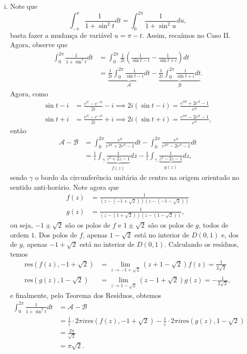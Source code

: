 \documentclass[12pt,a4paper]{article}
\newcommand{\res}{\mathrm{res}}
\begin{document}
\begin{enumerate}
\begin{enumerate}[(i)]
		\item Note que 
		$$
		\int_{-\pi}^{\pi}\frac{1}{1 + \sin^2t}dt = \int_{0}^{2\pi}\frac{1}{1 + \sin^2 u}du,
		$$
		basta fazer a mudança de variável $u = \pi - t$. Assim, recaímos no Caso II. Agora, observe que
		\begin{align*}
		\int_{0}^{2\pi}\frac{1}{1 + \sin^2 t}dt &= \int_{0}^{2\pi}\frac{1}{2i}\left( \frac{1}{\sin t - i} - \frac{1}{\sin t + i} \right)dt \\ 
		&= \underbrace{\frac{1}{2i}\int_{0}^{2\pi}\frac{1}{\sin t - i}dt}_{\mathcal{A}} - \underbrace{\frac{1}{2i}\int_{0}^{2\pi}\frac{1}{\sin t + i}dt}_{\mathcal{B}}.
		\end{align*}
		Agora, como
		\begin{align*}
		\sin t - i &= \frac{e^{it} - e^{-it}}{2i} - i \implies 2i(\sin t - i) = \frac{e^{2it} + 2e^{it} - 1}{e^{it}} \\
		\sin t + i &= \frac{e^{it} - e^{-it}}{2i} + i \implies 2i(\sin t + i) = \frac{e^{2it} - 2e^{it} - 1}{e^{it}},
		\end{align*}
		então
		\begin{align*}
		\mathcal{A} - \mathcal{B} &= \int_{0}^{2\pi}\frac{e^{it}}{e^{2it} + 2e^{it} - 1}dt - \int_{0}^{2\pi}\frac{e^{it}}{e^{2it} - 2e^{it} - 1}dt \\
		&= \frac{1}{i}\int_{\gamma}\underbrace{\frac{1}{z^2 + 2z - 1}}_{f(z)}dz - \frac{1}{i}\int_{\gamma}\underbrace{\frac{1}{z^2 - 2z - 1}}_{g(z)}dz,
		\end{align*}
		sendo $\gamma$ o bordo da circunferência unitária de centro na origem orientado no sentido anti-horário. Note agora que 
		\begin{align*}
		f(z) &= \frac{1}{(z-(-1+\sqrt{2}))(z-(-1-\sqrt{2}))} \\
		g(z) &= \frac{1}{(z-(1+\sqrt{2}))(z-(1-\sqrt{2}))},
		\end{align*}
		ou seja, $-1\pm\sqrt{2}$ são os polos de $f$ e $1\pm\sqrt{2}$ são os polos de $g$, todos de ordem $1$. Dos polos de $f$, apenas $1-\sqrt{2}$ está no interior de $D(0,1)$ e, dos de $g$, apenas $-1+\sqrt{2}$ está no interior de $D(0,1)$. Calculando os resíduos, temos
		\begin{align*}
		\res(f(z),-1+\sqrt{2}) &= \lim\limits_{z\to -1+\sqrt{2}}(z+1-\sqrt{2})f(z) = \frac{1}{2\sqrt{2}} \\
		\res(g(z),1-\sqrt{2}) &= \lim\limits_{z\to 1-\sqrt{2}}(z-1+\sqrt{2})g(z) = -\frac{1}{2\sqrt{2}},
		\end{align*}
		e finalmente, pelo Teorema dos Resíduos, obtemos
		\begin{align*}
		\int_{0}^{2\pi}\frac{1}{1 + \sin^2 t}dt &= \mathcal{A} - \mathcal{B} \\
		&= \frac{1}{i}\cdot 2\pi i\res(f(z),-1+\sqrt{2}) - \frac{1}{i}\cdot 2\pi i\res(g(z),1-\sqrt{2}) \\
		&= \frac{2\pi}{\sqrt{2}} \\
		&= \pi\sqrt{2}.
		\end{align*}	
		

\end{enumerate}
\end{enumerate}
\end{document}
